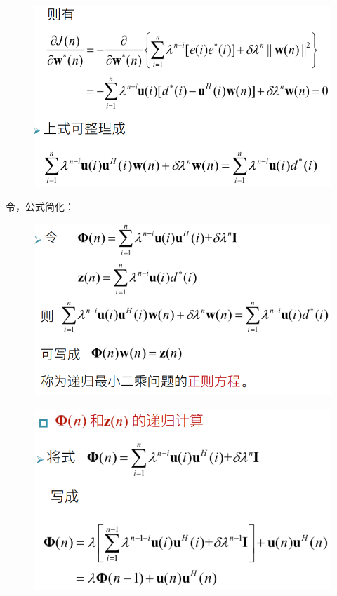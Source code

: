 \documentclass[UTF8]{ctexart} %
\begin{document}
				\begin{figure}[H]
					\centering\includegraphics[scale=0.4]{53.png}
				\end{figure}
				令，公式简化：
				\begin{figure}[H]
					\centering\includegraphics[scale=0.4]{54.png}
				\end{figure}
				\begin{figure}[H]
					\centering\includegraphics[scale=0.4]{55.png}
				\end{figure}
\end{document}
